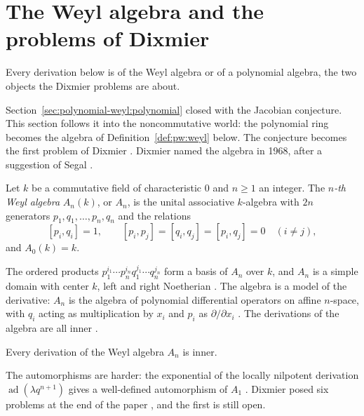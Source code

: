 \section{The Weyl algebra and the problems of Dixmier}\label{sec:polynomial-weyl:weyl}

Every derivation below is of the Weyl algebra or of a polynomial algebra, the
two objects the Dixmier problems are about. %

Section~\ref{sec:polynomial-weyl:polynomial} closed with the Jacobian
conjecture. This section follows it into the noncommutative world: the
polynomial ring becomes the algebra of Definition~\ref{def:pw:weyl} below.
The conjecture becomes the first problem of Dixmier
\cite[p.~241]{Dixmier1968}. Dixmier named the algebra in 1968, after a
suggestion of Segal \cite[p.~209]{Dixmier1968}.

\begin{definition}\label{def:pw:weyl}
Let $k$ be a commutative field of characteristic $0$ and $n\geq1$ an
integer. The \emph{$n$-th Weyl algebra} $A_{n}(k)$, or $A_{n}$, is the
unital associative $k$-algebra with $2n$ generators
$p_{1},q_{1},\dots,p_{n},q_{n}$ and the relations
\[
[p_{i},q_{i}]=1,\qquad [p_{i},p_{j}]=[q_{i},q_{j}]=[p_{i},q_{j}]=0
\quad(i\neq j),
\]
and $A_{0}(k)=k$.
\end{definition}

The ordered products $p_{1}^{i_{1}}\cdots p_{n}^{i_{n}}q_{1}^{j_{1}}\cdots
q_{n}^{j_{n}}$ form a basis of $A_{n}$ over $k$, and $A_{n}$ is a simple
domain with center $k$, left and right Noetherian
\cite[p.~210]{Dixmier1968}. The algebra is a model of the derivative:
$A_{n}$ is the algebra of polynomial differential operators on affine
$n$-space, with $q_{i}$ acting as multiplication by $x_{i}$ and $p_{i}$ as
$\partial/\partial x_{i}$ \cite[p.~1]{BelovKanelKontsevich2007}. The
derivations of the algebra are all inner \cite[p.~210]{Dixmier1968}.

\begin{proposition}\label{prop:pw:weyl-inner}
Every derivation of the Weyl algebra $A_{n}$ is inner.
\end{proposition}

The automorphisms are harder: the exponential of the locally nilpotent
derivation $\operatorname{ad}(\lambda q^{n+1})$ gives a well-defined
automorphism of $A_{1}$ \cite[p.~210]{Dixmier1968}. Dixmier posed six
problems at the end of the paper \cite[p.~241]{Dixmier1968}, and the
first is still open.

